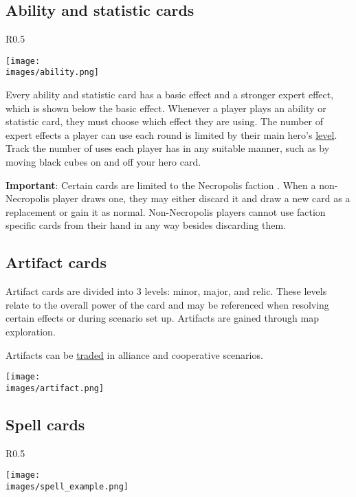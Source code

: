 \clearpage
\subsection*{\hypertarget{Ability}{Ability and statistic cards}}
\begin{wrapfigure}{R}{0.5\textwidth}

    \texttt{[image: \\images/ability.png]}

\end{wrapfigure}

Every ability and statistic card has a basic effect and a stronger expert effect, which is shown below the basic effect.
Whenever a player plays an ability or statistic card, they must choose which effect they are using.
The number of expert  effects a player can use each round is limited by their main hero’s \hyperlink{Level}{level}.
Track the number of uses each player has in any suitable manner, such as by moving black cubes on and off your hero card.\par
\textbf{Important}: Certain cards are limited to the Necropolis faction .
When a non-Necropolis player draws one, they may either discard it and draw a new card as a replacement or gain it as normal.
Non-Necropolis players cannot use faction specific cards from their hand in any way besides discarding them.

\subsection*{Artifact cards}
Artifact cards are divided into 3 levels: minor, major, and relic.
These levels relate to the overall power of the card and may be referenced when resolving certain effects or during scenario set up.
Artifacts are gained through map exploration.\par
Artifacts can be \hyperlink{Trading}{traded} in alliance and cooperative scenarios.\par
\texttt{[image: \\images/artifact.png]}


\clearpage

\subsection*{\hypertarget{spells}{Spell cards}}
\begin{wrapfigure}{R}{0.5\textwidth}
    \begin{center}
    \texttt{[image: \\images/spell\_example.png]}
    \end{center}
\end{wrapfigure}


